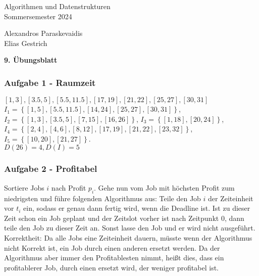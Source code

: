 \documentclass[11pt]{scrartcl}
\newcommand{\sheetNum}{9} %
\newcommand{\studentOne}{Alexandros Paraskevaidis} %
\newcommand{\studentTwo}{Elias Gestrich} %
\newcommand{\task}[1]{\subsubsection*{#1}}
\begin{document}
\begin{small}
\begin{minipage}{0.5 \linewidth}
  Algorithmen und Datenstrukturen\\
  Sommersemester 2024
\end{minipage}
\begin{minipage}{0.5\linewidth}
  \begin{flushright}
    \studentOne\\
    \studentTwo
  \end{flushright}
\end{minipage}
\end{small}
\begin{center}
\begin{sffamily}\Large\bfseries \sheetNum. Übungsblatt\end{sffamily}
\end{center}


\task{Aufgabe 1 - Raumzeit}
$ [1,3], [3.5, 5], [5.5, 11.5], [17, 19], [21, 22], [25, 27], [30, 31] $\\
$ I_1 = \left\{ [1, 5], [5.5, 11.5], [14, 24], [25, 27], [30, 31] \right\}  $,
$ I_2 = \left\{ [1, 3], [3.5, 5], [7, 15], [16, 26] \right\}  $,
$ I_3 = \left\{ [1, 18], [20, 24] \right\}  $,
$ I_4 = \left\{ [2, 4], [4, 6], [8, 12], [17, 19], [21, 22], [23, 32] \right\}  $,
$ I_5 = \left\{ [10, 20], [21, 27] \right\}  $.\\
$ D(26) = 4, D(I) = 5 $

\task{Aufgabe 2 - Profitabel}
Sortiere Jobs $ i $ nach Profit $ p_i $.
Gehe nun vom Job mit höchsten Profit zum niedrigsten und führe folgenden Algorithmus aus:
Teile den Job $ i $ der Zeiteinheit vor $ t_i $ ein, sodass er genau dann fertig wird, wenn die Deadline ist.
Ist zu dieser Zeit schon ein Job geplant und der Zeitslot vorher ist nach Zeitpunkt 0, dann teile den Job zu dieser Zeit an.
Sonst lasse den Job und er wird nicht ausgeführt.\\
Korrektheit: Da alle Jobs eine Zeiteinheit dauern, müsste wenn der Algorithmus nicht Korrekt ist, ein Job durch einen anderen ersetzt werden.
Da der Algorithmus aber immer den Profitablesten nimmt, heißt dies, dass ein profitablerer Job, durch einen ersetzt wird, der weniger profitabel ist.
\end{document}
